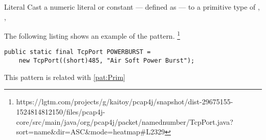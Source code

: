\begin{pattern}{Literal}
Cast a numeric literal or constant --- defined as  ---
to a primitive type of
, , 

\instances

The following listing shows an example of the  pattern.%
\footnote{https://lgtm.com/projects/g/kaitoy/pcap4j/snapshot/dist-29675155-1524814812150/files/pcap4j-core/src/main/java/org/pcap4j/packet/namednumber/TcpPort.java?sort=name\&dir=ASC\&mode=heatmap\#L2329}

\begin{lstlisting}[style=java,caption=Literal example]
public static final TcpPort POWERBURST =
    new TcpPort((short)485, "Air Soft Power Burst");
\end{lstlisting}

\discussion

This pattern is related with \ref{pat:Prim}

\end{pattern}